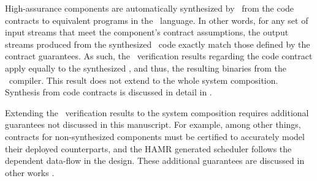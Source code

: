 High-assurance components are automatically synthesized by \splt\ from
the code contracts to equivalent programs in the \ckml\
language.
In other words, for any set of input streams that meet the
component's contract assumptions, the output streams produced from
the synthesized \ckml\ code exactly match those defined by the contract guarantees.
As such, the \agr\ verification results regarding the code contract apply equally to the synthesized \ckml, and thus, the resulting binaries from the \ckml\ compiler.
This result does not extend to the whole system composition.
Synthesis from code contracts is discussed in detail in .

Extending the \agr\ verification results to the system composition requires additional guarantees not discussed in this manuscript.
For example, among other things, contracts for non-synthesized components must be certified to accurately model their deployed counterparts, and the HAMR generated scheduler follows the dependent data-flow in the design.
These additional guarantees are discussed in other works \cite{gearcase2020, dcrypps2019, 10.1007/978-3-030-89159-6_18, 10.1007/978-3-030-89159-6_17, sel4-2009, scheduled-agree, 9734792}.
